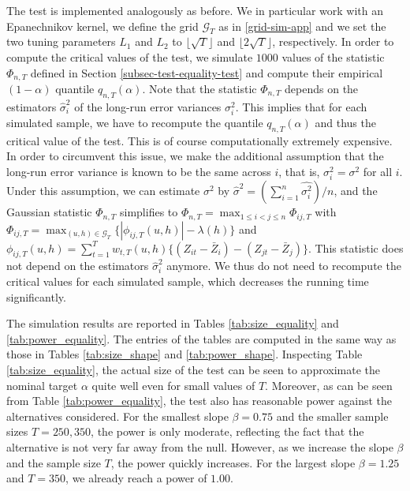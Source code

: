 The test is implemented analogously as before. We in particular work with an Epanechnikov kernel, we define the grid $\mathcal{G}_T$ as in \eqref{grid-sim-app} and we set the two tuning parameters $L_1$ and $L_2$ to $\lfloor \sqrt{T} \rfloor$ and $\lfloor 2\sqrt{T} \rfloor$, respectively. In order to compute the critical values of the test, we simulate $1000$ values of the statistic $\Phi_{n,T}$ defined in Section \ref{subsec-test-equality-test} and compute their empirical $(1-\alpha)$ quantile $q_{n,T}(\alpha)$. Note that the statistic $\Phi_{n,T}$ depends on the estimators $\widehat{\sigma}_i^2$ of the long-run error variances $\sigma_i^2$. This implies that for each simulated sample, we have to recompute the quantile $q_{n,T}(\alpha)$ and thus the critical value of the test. This is of course computationally extremely expensive. In order to circumvent this issue, we make the additional assumption that the long-run error variance is known to be the same across $i$, that is, $\sigma_i^2 = \sigma^2$ for all $i$. Under this assumption, we can estimate $\sigma^2$ by $\widehat{\sigma}^2 = (\sum_{i = 1}^n\widehat{\sigma_i^2})/n$, and the Gaussian statistic $\Phi_{n,T}$ simplifies to $\Phi_{n,T} = \max_{1 \le i < j \le n} \Phi_{ij,T}$ with $\Phi_{ij,T} = \max_{(u,h) \in \mathcal{G}_T} \{ | \phi_{ij,T}(u,h)| - \lambda(h) \}$ and $\phi_{ij,T}(u,h) = \sum_{t=1}^T w_{t,T}(u,h) \{ (Z_{it} - \bar{Z}_i) - (Z_{jt} - \bar{Z}_j)\}$. This statistic does not depend on the estimators $\widehat{\sigma}_i^2$ anymore. We thus do not need to recompute the critical values for each simulated sample, which decreases the running time significantly.


The simulation results are reported in Tables \ref{tab:size_equality} and \ref{tab:power_equality}. The entries of the tables are computed in the same way as those in Tables \ref{tab:size_shape} and \ref{tab:power_shape}. Inspecting Table \ref{tab:size_equality}, the actual size of the test can be seen to approximate the nominal target $\alpha$ quite well even for small values of $T$. Moreover, as can be seen from Table \ref{tab:power_equality}, the test also has reasonable power against the alternatives considered. For the smallest slope $\beta=0.75$ and the smaller sample sizes $T = 250, 350$, the power is only moderate, reflecting the fact that the alternative is not very far away from the null. However, as we increase the slope $\beta$ and the sample size $T$, the power quickly increases. For the largest slope $\beta = 1.25$ and $T=350$, we already reach a power of $1.00$.


